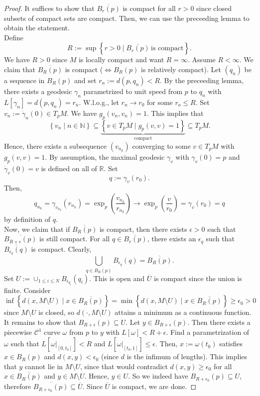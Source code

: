 \begin{proof}
   It suffices to show that $\overline{B_r(p)}$ is compact for all $r>0$ since closed subsets of compact sets are compact. Then, we can use the preceeding lemma to obtain the statement.\\
   Define \[
       R:= \sup \left\{r>0 \mid \overline{B_r(p)} \, \text{is compact} \right\} 
   .\]  We have $R>0$ since $M$ is locally compact and want $R=\infty$. Assume $R < \infty$. We claim that $\overline{B_R(p)}$ is compact ($\iff B_R(p)$ is relatively compact). Let $(q_n)$ be a sequence in $B_R(p)$ and set $r_n:=d(p,q_n) < R$. By the preceeding lemma, there exists a geodesic $\gamma_n$ parametrized to unit speed from $p$ to $q_n$ with $L[\gamma_n]=d(p,q_n)=r_n$. W.l.o.g., let $r_n \to r_0$ for some $r_o \leq R$. Set $v_n:=\dot{\gamma}_n(0) \in T_pM$. We have $g_p(v_n,v_n)=1$. This implies that \[
   \left\{v_n \mid n \in \mathbb{N}\right\} \subseteq \underbrace{\left\{v \in T_pM \mid g_p(v,v)=1\right\}}_\text{compact} \subseteq T_pM
   .\] Hence, there exists a subsequence $(v_{n_k})$ converging to some $v \in T_pM$ with $g_p(v,v)=1$. By assumption, the maximal geodesic $\gamma_v$ with $\gamma_v(0)=p$ and $\dot{\gamma}_v(0)=v$ is defined on all of $\mathbb{R}$. Set \[
q:= \gamma_v(r_0)
.\]  Then, \[
q_{n_k} = \gamma_{v_{n_k}} (r_{n_k})=\exp_p\left(\frac{v_{n_k}}{r_{n_k}}\right) \to  \exp_p\left(\frac{v}{r_0} \right)=\gamma_v(r_0)=q
\] by definition of $q$.\\
Now, we claim that if $\overline{B_R(p)}$ is compact, then there exists $\epsilon >0$ such that $\overline{B_{R+\epsilon}(p)}$ is still compact. For all $q \in \overline{B_r(p)}$, there exists an $\epsilon_q$ such that $\overline{B_{\epsilon_q}(q)}$ is compact. Clearly, \[
    \bigcup_{q \in \overline{B_R(p)} } B_{\epsilon_q}(q) = \overline{B_R(p)} 
.\] Set $U := \cup_{1 \leq i \leq N} B_{\epsilon_{q_i}}(q_i)$. This is open and $\overline{U}$ is compact since the union is finite. Consider \[
\inf \left\{d(x,M \setminus U) \mid x \in \overline{B_R(p)} \right\}  = \min \left\{d(x,M \setminus U) \mid x \in \overline{B_R(p)} \right\} \geq \epsilon_0 >0
\] since $M \setminus U$ is closed, so $d(\cdot, M \setminus U)$ attains a minimum as a continuous function. \\
It remains to show that $B_{R + \epsilon}(p) \subseteq U$. Let $y \in B_{R + \epsilon}(p)$. Then there exists a piecewise $\mathcal{C}^1$ curve $\omega$ from $p$ to $y$ with $L[\omega]<R+\epsilon$. Find a parametrization of $\omega$ such that $L[\omega|_{[0,t_0]}] < R$ and $L[\omega|_{[t_0,1]}] \leq \epsilon$. Then, $x:=\omega(t_0)$ satisfies $x \in B_R(p)$ and $d(x,y)<\epsilon_0$ (since $d$ is the infimum of lengths). This implies that $y$ cannot lie in $M \setminus U$, since that would contradict $d(x,y) \geq \epsilon_0$ for all $x \in \overline{B_R(p)}$ and $y \in M \setminus U$. Hence, $y \in U$. So we indeed have $B_{R+\epsilon_0}(p)\subseteq U$, therefore $\overline{B_{R+\epsilon_0}(p)} \subseteq \overline{U} $. Since $\overline{U}$ is compact, we are done. 
\end{proof}
